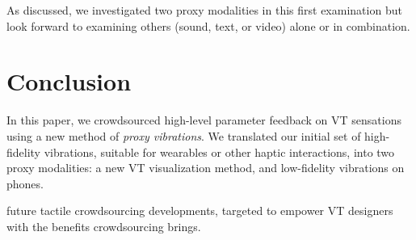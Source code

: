     As discussed, we investigated two proxy modalities in this first examination but look forward to examining others (sound, text, or video) alone or in combination.
        

      
\section{Conclusion}
In this paper, we crowdsourced high-level parameter feedback on VT sensations using a new method of \emph{proxy vibrations}.
We translated our initial set of high-fidelity vibrations, suitable for wearables or other haptic interactions, into two proxy modalities: a new VT visualization method, and low-fidelity vibrations on phones.

future tactile crowdsourcing developments, targeted to empower VT designers with the benefits crowdsourcing brings.




\endinput
